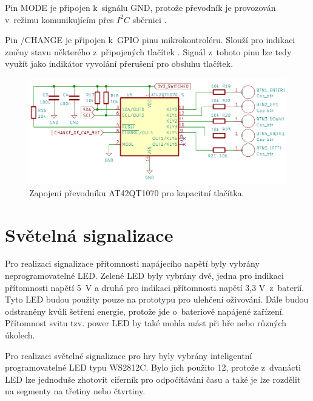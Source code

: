 Pin MODE je připojen k~signálu GND, protože převodník je provozován v~režimu komunikujícím přes $I^2C$ sběrnici \cite{conv_cap_but_AT42QT1070_dtsh}.

Pin /CHANGE je připojen k~GPIO pinu mikrokontroléru. Slouží pro indikaci změny stavu některého z~připojených tlačítek \cite{conv_cap_but_AT42QT1070_dtsh}. 
Signál z~tohoto pinu lze tedy využít jako indikátor vyvolání přerušení pro obsluhu tlačítek. 

\begin{figure}[!h]
    \begin{center}
      \includegraphics[scale=0.4]{obrazky/AT42QT1070.png}
    \end{center}
    \caption[Zapojení převodníku AT42QT1070 pro kapacitní tlačítka]{Zapojení převodníku AT42QT1070 pro kapacitní tlačítka.}
\end{figure}

\section{Světelná signalizace}
Pro realizaci signalizace přítomnosti napájecího napětí byly vybrány neprogramovatelné LED. Zelené LED byly vybrány dvě, jedna pro 
indikaci přítomnosti napětí 5~V a druhá pro indikaci přítomnosti napětí 3,3 V~z~baterií. Tyto LED budou použity pouze na prototypu 
pro ulehčení oživování. Dále budou odstraněny kvůli šetření energie, protože jde o~bateriově napájené zařízení. Přítomnost svitu 
tzv. power LED by také mohla mást při hře nebo různých úkolech.

Pro realizaci světelné signalizace pro hry byly vybrány inteligentní programovatelné LED typu WS2812C. Bylo jich použito 12, protože 
z~dvanácti LED lze jednoduše zhotovit ciferník pro odpočítávání času a také je lze rozdělit na segmenty na třetiny nebo čtvrtiny. 

